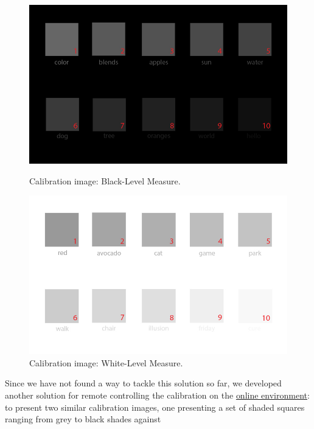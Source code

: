 \begin{figure}[htbp]
  \centering
  \begin{minipage}{0.48\textwidth}
		\centering
	  \includegraphics[width=\textwidth]{images/implementation/calibration_blackLevel.jpg}
	  \caption[Calibration image: Black-Level Measure.]{Calibration image: Black-Level Measure.}
	  \label{fig:black_level}
  \end{minipage}\hfill
  \begin{minipage}{0.48\textwidth}
		\centering
	  \includegraphics[width=\textwidth]{images/implementation/calibration_whiteLevel.jpg}
	  \caption[Calibration image: White-Level Measure.]{Calibration image: White-Level Measure.}
	  \label{fig:white_level}
  \end{minipage}
\end{figure}
%
Since we have not found a way to tackle this solution so far, we developed another solution for remote controlling the calibration on the
\ul{online environment}: to present two similar calibration images, one presenting a set of shaded squares ranging from grey to black shades against
